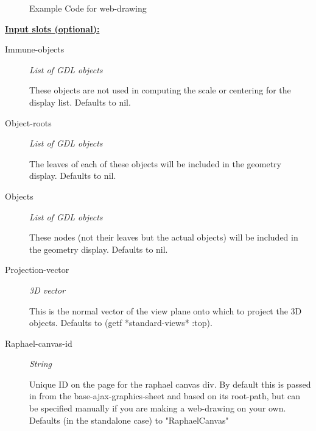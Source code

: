 \documentclass [11pt]{book}
\begin{document}
\begin{itemize}
\begin{figure}
\begin{lrbox}{\boxedverb}
\begin{minipage}{\linewidth}
{\begin{verbatim}
\end{verbatim}}
\end{minipage}
\end{lrbox}
\fbox{\usebox{\boxedverb}}

\caption{Example Code for web-drawing}

\label{fig:example-code-web-drawing}

\end{figure}





\textbf{
\underline{Input slots (optional):}}

\begin{description}

\item [Immune-objects]
\emph{List of GDL objects}

 These objects are not used in computing the scale or centering for the display list. Defaults to nil.




\item [Object-roots]
\emph{List of GDL objects}

 The leaves of each of these objects will be included in the geometry display. Defaults to nil.




\item [Objects]
\emph{List of GDL objects}

 These nodes (not their leaves but the actual objects) will be included in the geometry display. Defaults to nil.




\item [Projection-vector]
\emph{3D vector}

 This is the normal vector of the view plane onto which to project the 3D objects. Defaults to (getf *standard-views* :top).




\item [Raphael-canvas-id]
\emph{String}

 Unique ID on the page for the raphael canvas div. By default this is passed in
from the base-ajax-graphics-sheet and based on its root-path, but can be specified manually
if you are making a web-drawing on your own. Defaults (in the standalone case) to "RaphaelCanvas"





\end{description}
\end{itemize}
\end{document}
